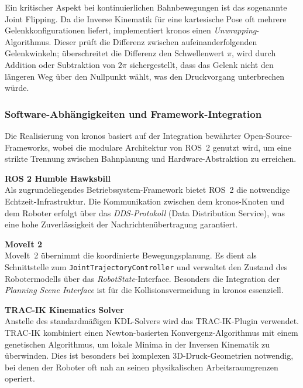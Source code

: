                 Ein kritischer Aspekt bei kontinuierlichen Bahnbewegungen ist das sogenannte \glqq Joint Flipping\grqq. 
                Da die Inverse Kinematik für eine kartesische Pose oft mehrere Gelenkkonfigurationen liefert, implementiert \ac{kronos} einen \textit{Unwrapping}-Algorithmus.
                Dieser prüft die Differenz zwischen aufeinanderfolgenden Gelenkwinkeln; überschreitet die Differenz den Schwellenwert $\pi$, wird durch Addition oder Subtraktion von $2\pi$ sichergestellt, dass das Gelenk nicht den längeren Weg über den Nullpunkt wählt, was den Druckvorgang unterbrechen würde.

            \subsubsection{Software-Abhängigkeiten und Framework-Integration}
                \label{subsubssec:dependencies}
                Die Realisierung von \ac{kronos} basiert auf der Integration bewährter Open-Source-Frameworks, wobei die modulare Architektur von \ac{ROS}~2 genutzt wird, um eine strikte Trennung zwischen Bahnplanung und Hardware-Abstraktion zu erreichen.

                \textbf{ROS 2 Humble Hawksbill}\\
                Als zugrundeliegendes Betriebssystem-Framework bietet \ac{ROS}~2 die notwendige Echtzeit-Infrastruktur. 
                Die Kommunikation zwischen dem \ac{kronos}-Knoten und dem Roboter erfolgt über das \textit{DDS-Protokoll} (Data Distribution Service), was eine hohe Zuverlässigkeit der Nachrichtenübertragung garantiert.

                \textbf{MoveIt 2}\\
                MoveIt~2 übernimmt die koordinierte Bewegungsplanung. 
                Es dient als Schnittstelle zum \texttt{JointTrajectoryController} und verwaltet den Zustand des Robotermodells über das \textit{RobotState}-Interface. 
                Besonders die Integration der \textit{Planning Scene Interface} ist für die Kollisionsvermeidung in \ac{kronos} essenziell.

                \textbf{TRAC-IK Kinematics Solver}\\
                Anstelle des standardmäßigen KDL-Solvers wird das TRAC-IK-Plugin verwendet. 
                TRAC-IK kombiniert einen Newton-basierten Konvergenz-Algorithmus mit einem genetischen Algorithmus, um lokale Minima in der Inversen Kinematik zu überwinden. 
                Dies ist besonders bei komplexen 3D-Druck-Geometrien notwendig, bei denen der Roboter oft nah an seinen physikalischen Arbeitsraumgrenzen operiert.

